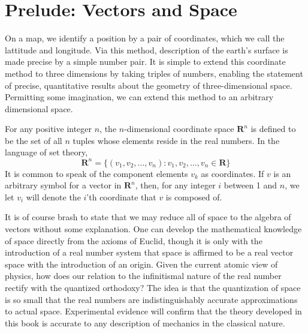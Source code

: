\begin{comment}
\DeclareMathOperator{\CT}{ {{\otimes}^\wedge} }

\DeclareMathOperator{\msupp}{\text{$\mu$-supp}}
\DeclareMathOperator{\singsupp}{\text{sing-supp}}
\DeclareMathOperator{\Char}{\text{Char}}

\DeclareMathOperator*{\argmax}{arg\,max}
\DeclareMathOperator*{\argmin}{arg\,min}

\DeclareMathOperator{\ssm}{\smallsetminus}


\end{comment}














\tableofcontents

\chapter*{Prelude: Vectors and Space}

On a map, we identify a position by a pair of coordinates, which we call the lattitude and longitude. Via this method, description of the earth's surface is made precise by a simple number pair. It is simple to extend this coordinate method to three dimensions by taking triples of numbers, enabling the statement of precise, quantitative results about the geometry of three-dimensional space. Permitting some imagination, we can extend this method to an arbitrary dimensional space.

\theoremstyle{definition}
\begin{definition}
  For any positive integer $n$, the $n$-dimensional coordinate space $\mathbf{R}^n$ is defined to be the set of all $n$ tuples whose elements reside in the real numbers. In the language of set theory,
  \[ \mathbf{R}^n = \{ (v_1, v_2, \dots, v_n) : v_1, v_2, \dots, v_n \in \mathbf{R} \} \]
  It is common to speak of the component elements $v_k$ as coordinates. If $v$ is an arbitrary symbol for a vector in $\mathbf{R}^n$, then, for any integer $i$ between 1 and $n$, we let $v_i$ will denote the $i$'th coordinate that $v$ is composed of.
\end{definition}
%
It is of course brash to state that we may reduce all of space to the algebra of vectors without some explanation. One can develop the mathematical knowledge of space directly from the axioms of Euclid, though it is only with the introduction of a real number system that space is affirmed to be a real vector space with the introduction of an origin. Given the current atomic view of physics, how does our relation to the infinitismal nature of the real number rectify with the quantized orthodoxy? The idea is that the quantization of space is so small that the real numbers are indistinguishably accurate approximations to actual space. Experimental evidence will confirm that the theory developed in this book is accurate to any description of mechanics in the classical nature.

